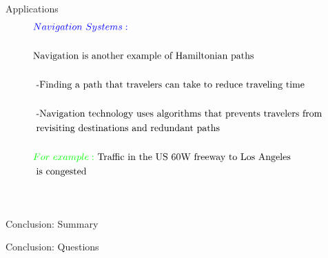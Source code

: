 \documentclass[pdf]{beamer}
\begin{document}
    \begin{frame}{Applications}
        \begin{align*}
            &\textcolor{blue}{Navigation}\text{ } \textcolor{blue}{Systems:}\\
            &\\
            &\text{Navigation is another example of Hamiltonian paths}\\
            &\\
            &\text{ -Finding a path that travelers can take to reduce traveling time}\\
            &\\
            &\text{ -Navigation technology uses algorithms that prevents travelers from }\\
            &\text{ revisiting destinations and redundant paths}\\
            &\\
            &\textcolor{green}{For }\text{ }\textcolor{green}{example: }\text{ Traffic in the US 60W freeway to Los Angeles }\\
            &\text{ is congested}\\
            \\ %
            &\\
        \end{align*}
    \end{frame}

    \begin{frame}{Conclusion: Summary}

    \end{frame}

    \begin{frame}{Conclusion: Questions}

    \end{frame}
\end{document}
